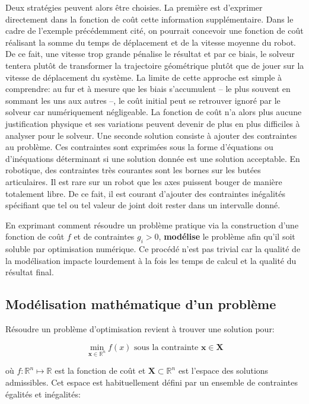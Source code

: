 Deux stratégies peuvent alors être choisies. La première est
d'exprimer directement dans la fonction de coût cette information
supplémentaire. Dans le cadre de l'exemple précédemment cité, on
pourrait concevoir une fonction de coût réalisant la somme du temps de
déplacement et de la vitesse moyenne du robot. De ce fait, une vitesse
trop grande pénalise le résultat et par ce biais, le solveur tentera
plutôt de transformer la trajectoire géométrique plutôt que de jouer
sur la vitesse de déplacement du système. La limite de cette approche
est simple à comprendre: au fur et à mesure que les biais s'accumulent
-- le plus souvent en sommant les uns aux autres --, le coût initial
peut se retrouver ignoré par le solveur car numériquement
négligeable. La fonction de coût n'a alors plus aucune justification
physique et ses variations peuvent devenir de plus en plus difficiles
à analyser pour le solveur.  Une seconde solution consiste à ajouter
des contraintes au problème. Ces contraintes sont exprimées sous la
forme d'équations ou d'inéquations déterminant si une solution donnée
est une solution acceptable. En robotique, des contraintes très
courantes sont les bornes sur les butées articulaires. Il est rare sur
un robot que les axes puissent bouger de manière totalement libre. De
ce fait, il est courant d'ajouter des contraintes inégalités
spécifiant que tel ou tel valeur de joint doit rester dans un
intervalle donné.


En exprimant comment résoudre un problème pratique via la construction
d'une fonction de coût $f$ et de contraintes $g_i > 0$,
\textbf{modélise} le problème afin qu'il soit soluble par optimisation
numérique. Ce procédé n'est pas trivial car la qualité de la
modélisation impacte lourdement à la fois les temps de calcul et la
qualité du résultat final.



\subsection{Modélisation mathématique d'un problème}


Résoudre un problème d'optimisation revient à trouver une solution pour:

\begin{equation}
  \min_{\mathbf{x} \in \mathbb{R}^n} f(x) \text{ sous la contrainte } \mathbf{x} \in \mathbf{X}
\end{equation}

où $f : \mathbb{R}^n \mapsto \mathbb{R}$ est la fonction de coût et
$\mathbf{X} \subset \mathbb{R}^n$ est l'espace des solutions
admissibles. Cet espace est habituellement défini par un ensemble de
contraintes égalités et inégalités:

